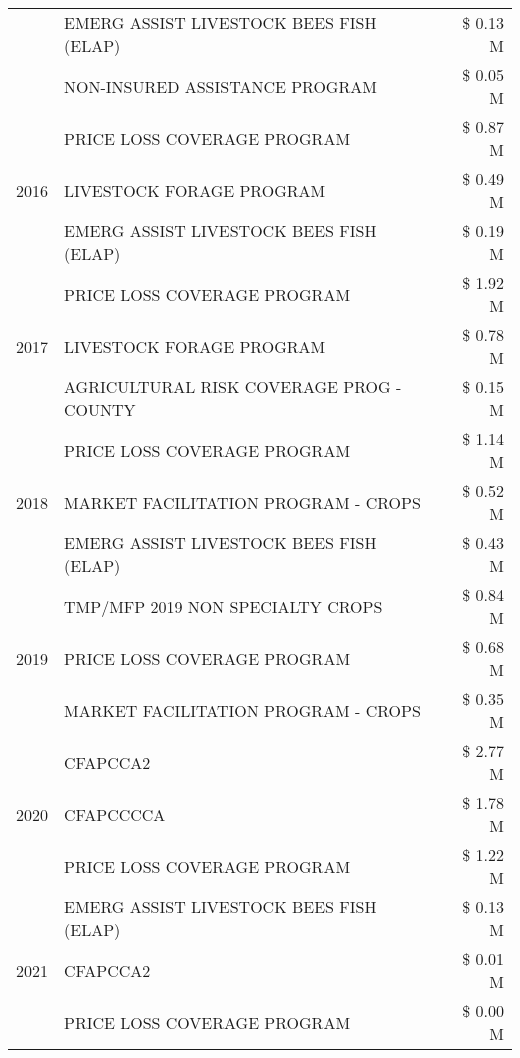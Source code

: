 \begin{tabular}{llr}
 & EMERG ASSIST LIVESTOCK BEES FISH (ELAP) & \$ 0.13 M \\
 & NON-INSURED ASSISTANCE PROGRAM & \$ 0.05 M \\
\cline{1-3}
\multirow[t]{3}{*}{2016} & PRICE LOSS COVERAGE PROGRAM & \$ 0.87 M \\
 & LIVESTOCK FORAGE PROGRAM & \$ 0.49 M \\
 & EMERG ASSIST LIVESTOCK BEES FISH (ELAP) & \$ 0.19 M \\
\cline{1-3}
\multirow[t]{3}{*}{2017} & PRICE LOSS COVERAGE PROGRAM & \$ 1.92 M \\
 & LIVESTOCK FORAGE PROGRAM & \$ 0.78 M \\
 & AGRICULTURAL RISK COVERAGE PROG - COUNTY & \$ 0.15 M \\
\cline{1-3}
\multirow[t]{3}{*}{2018} & PRICE LOSS COVERAGE PROGRAM & \$ 1.14 M \\
 & MARKET FACILITATION PROGRAM - CROPS & \$ 0.52 M \\
 & EMERG ASSIST LIVESTOCK BEES FISH (ELAP) & \$ 0.43 M \\
\cline{1-3}
\multirow[t]{3}{*}{2019} & TMP/MFP 2019 NON SPECIALTY CROPS & \$ 0.84 M \\
 & PRICE LOSS COVERAGE PROGRAM & \$ 0.68 M \\
 & MARKET FACILITATION PROGRAM - CROPS & \$ 0.35 M \\
\cline{1-3}
\multirow[t]{3}{*}{2020} & CFAPCCA2 & \$ 2.77 M \\
 & CFAPCCCCA & \$ 1.78 M \\
 & PRICE LOSS COVERAGE PROGRAM & \$ 1.22 M \\
\cline{1-3}
\multirow[t]{3}{*}{2021} & EMERG ASSIST LIVESTOCK BEES FISH (ELAP) & \$ 0.13 M \\
 & CFAPCCA2 & \$ 0.01 M \\
 & PRICE LOSS COVERAGE PROGRAM & \$ 0.00 M \\
\cline{1-3}
\bottomrule
\end{tabular}

